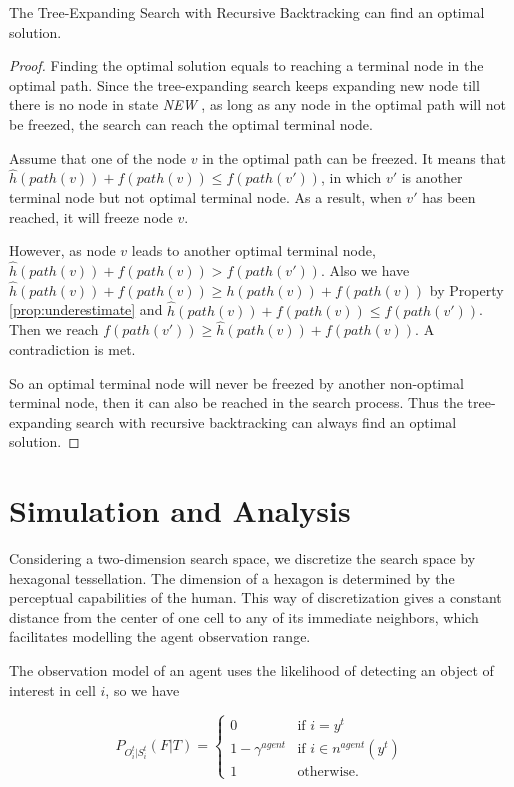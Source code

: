 \documentclass[12pt]{article}
\begin{document}
\begin{thm} 
\label{thm:optimal}
The Tree-Expanding Search with Recursive Backtracking can find an optimal solution.
\begin{proof}

Finding the optimal solution equals to reaching a terminal node in the optimal path. Since the tree-expanding search keeps expanding new node till there is no node in state \emph{NEW} , as long as any node in the optimal path will not be freezed, the search can reach the optimal terminal node.

Assume that one of the node $ v $ in the optimal path can be freezed. It means that $ \hat{h}(path(v)) + f(path(v)) \leq f(path(v')) $, in which $ v' $ is another terminal node but not optimal terminal node. As a result, when $ v' $ has been reached, it will freeze node $ v $. 

However, as node $ v $ leads to another optimal terminal node, $ \hat{h}(path(v)) + f(path(v)) > f(path(v')) $. Also we have $ \hat{h}(path(v)) + f(path(v)) \geq h(path(v)) + f(path(v)) $ by Property \ref{prop:underestimate} and $ \hat{h}(path(v)) + f(path(v)) \leq f(path(v')) $. Then we reach $ f(path(v')) \geq \hat{h}(path(v)) + f(path(v)) $. A contradiction is met.

So an optimal terminal node will never be freezed by another non-optimal terminal node, then it can also be reached in the search process. Thus the tree-expanding search with recursive backtracking can always find an optimal solution.

\end{proof}
\end{thm}

\section{Simulation and Analysis}

Considering a two-dimension search space, we discretize the search space by hexagonal tessellation. The dimension of a hexagon is determined by the perceptual capabilities of the human. This way of discretization gives a constant distance from the center of one cell to any of its immediate neighbors, which facilitates modelling the agent observation range.

The observation model of an agent uses the likelihood of detecting an object of interest in cell $ i $, so we have

\begin{equation}
\label{eq:agentObsMdl}
P_{O_{i}^{t}|S_{i}^{t}}(F|T)=
	\left\{
	\begin{array}{lcl}
	    0 & \mbox{if~} i=y^t \\
		1-\gamma^{agent} & \mbox{if~} i \in n^{agent}(y^t) \\
		1 & \mbox{otherwise.}
	\end{array}
	\right.
\end{equation}
\end{document}
